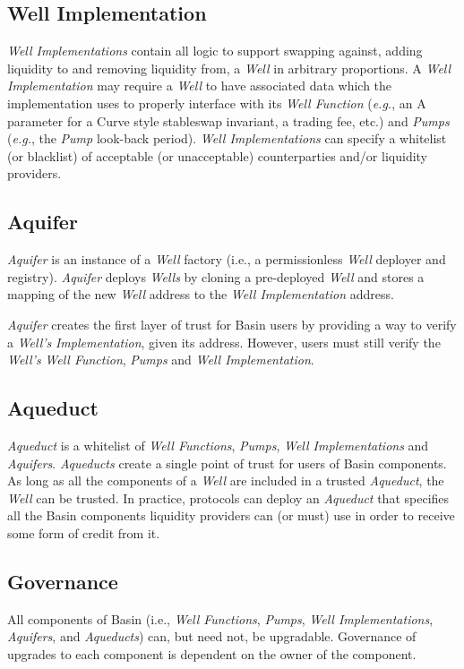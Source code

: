 \documentclass[tikz]{article}
\newcommand{\term}[1]{\textsl{#1}}
\begin{document}
\subsection{Well Implementation}
\vspace*{-0.1cm}
\term{Well Implementations} contain all logic to support swapping against, adding liquidity to and removing liquidity from, a \term{Well} in arbitrary proportions. A \term{Well Implementation} may require a \term{Well} to have associated data which the implementation uses to properly interface with its \term{Well Function} (\textit{e.g.}, an A parameter for a Curve style stableswap invariant, a trading fee, etc.) and \term{Pumps} (\textit{e.g.}, the \term{Pump} look-back period). \term{Well Implementations} can specify a whitelist (or blacklist) of acceptable (or unacceptable) counterparties and/or liquidity providers.

\subsection{Aquifer}
\vspace*{-0.1cm}
\term{Aquifer} is an instance of a \term{Well} factory (i.e., a permissionless \term{Well} deployer and registry). \term{Aquifer} deploys \term{Wells} by cloning a pre-deployed \term{Well} and stores a mapping of the new \term{Well} address to the \term{Well Implementation} address. 

\term{Aquifer} creates the first layer of trust for Basin users by providing a way to verify a \term{Well's} \term{Implementation}, given its address. However, users must still verify the \term{Well's} \term{Well Function}, \term{Pumps} and \term{Well Implementation}.

\subsection{Aqueduct}
\term{Aqueduct} is a whitelist of \term{Well Functions}, \term{Pumps}, \term{Well Implementations} and \term{Aquifers}. \term{Aqueducts} create a single point of trust for users of Basin components. As long as all the components of a \term{Well} are included in a trusted \term{Aqueduct}, the \term{Well} can be trusted. In practice, protocols can deploy an \term{Aqueduct} that specifies all the Basin components liquidity providers can (or must) use in order to receive some form of credit from it. 

\subsection{Governance}
All components of Basin (i.e., \term{Well Functions}, \term{Pumps}, \term{Well Implementations},  \term{Aquifers}, and \term{Aqueducts}) can, but need not, be upgradable. Governance of upgrades to each component is dependent on the owner of the component. 
\end{document}
